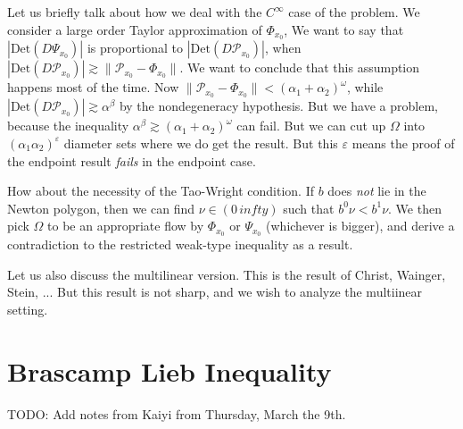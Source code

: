 Let us briefly talk about how we deal with the $C^\infty$ case of the problem. We consider a large order Taylor approximation of $\Phi_{x_0}$, We want to say that $|\text{Det}(D \Psi_{x_0})|$ is proportional to $|\text{Det}(D \mathcal{P}_{x_0})|$, when $|\text{Det}(D \mathcal{P}_{x_0})| \gtrsim \| \mathcal{P}_{x_0} - \Phi_{x_0} \|$. We want to conclude that this assumption happens most of the time. Now $\| \mathcal{P}_{x_0} - \Phi_{x_0} \| < (\alpha_1 + \alpha_2)^\omega$, while $|\text{Det}(D \mathcal{P}_{x_0})| \gtrsim \alpha^\beta$ by the nondegeneracy hypothesis. But we have a problem, because the inequality $\alpha^\beta \gtrsim (\alpha_1 + \alpha_2)^\omega$ can fail. But we can cut up $\Omega$ into $(\alpha_1 \alpha_2)^\varepsilon$ diameter sets where we do get the result. But this $\varepsilon$ means the proof of the endpoint result \emph{fails} in the endpoint case.


How about the necessity of the Tao-Wright condition. If $b$ does \emph{not} lie in the Newton polygon, then we can find $\nu \in (0\,infty)$ such that $b^0 \nu  < b^1 \nu$. We then pick $\Omega$ to be an appropriate flow by $\Phi_{x_0}$ or $\Psi_{x_0}$ (whichever is bigger), and derive a contradiction to the restricted weak-type inequality as a result.

Let us also discuss the multilinear version. This is the result of Christ, Wainger, Stein, ... But this result is not sharp, and we wish to analyze the multiinear setting.


\section{Brascamp Lieb Inequality}

TODO: Add notes from Kaiyi from Thursday, March the 9th.

